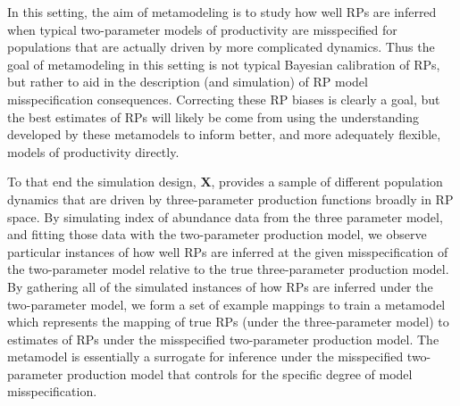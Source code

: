 %
In this setting, the aim of metamodeling is to study how well RPs are inferred
when typical two-parameter models of productivity %
are misspecified for populations that are actually driven by more 
complicated dynamics. %
Thus the goal of metamodeling in this setting is not typical Bayesian calibration \cite{kennedy_bayesian_2001} 
of RPs, but rather %
to aid in the description (and simulation) of RP 
model misspecification consequences. 
Correcting these RP biases is clearly a goal, %
but the best estimates of RPs will likely be come 
from using the understanding developed by these metamodels to inform better, %
and more adequately flexible, models of productivity directly.

%
To that end the simulation design, $\bm{X}$, provides a sample of 
different population dynamics that are driven by three-parameter production 
functions broadly in RP space. By simulating index of abundance data from the 
three parameter model, and fitting those data with the two-parameter production model, we %
observe particular instances of how well RPs are inferred at the given
misspecification of the two-parameter model relative to the true three-parameter
production model. By gathering all of the simulated instances of how RPs are
inferred under the two-parameter model, %
we form a set of example mappings to train a metamodel which represents the
mapping of true RPs (under the three-parameter model) to estimates of RPs under the
misspecified two-parameter production model. The metamodel is essentially a surrogate
for inference under the misspecified two-parameter production model that
controls for the specific degree of model misspecification.

